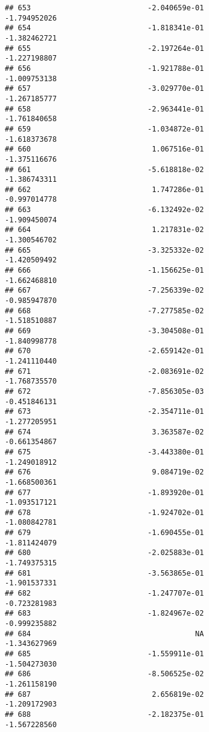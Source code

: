 \documentclass[
]{article}
\begin{document}
\begin{verbatim}
## 653                           -2.040659e-01               -1.794952026
## 654                           -1.818341e-01               -1.382462721
## 655                           -2.197264e-01               -1.227198807
## 656                           -1.921788e-01               -1.009753138
## 657                           -3.029770e-01               -1.267185777
## 658                           -2.963441e-01               -1.761840658
## 659                           -1.034872e-01               -1.618373678
## 660                            1.067516e-01               -1.375116676
## 661                           -5.618818e-02               -1.386743311
## 662                            1.747286e-01               -0.997014778
## 663                           -6.132492e-02               -1.909450074
## 664                            1.217831e-02               -1.300546702
## 665                           -3.325332e-02               -1.420509492
## 666                           -1.156625e-01               -1.662468810
## 667                           -7.256339e-02               -0.985947870
## 668                           -7.277585e-02               -1.518510887
## 669                           -3.304508e-01               -1.840998778
## 670                           -2.659142e-01               -1.241110440
## 671                           -2.083691e-02               -1.768735570
## 672                           -7.856305e-03               -0.451846131
## 673                           -2.354711e-01               -1.277205951
## 674                            3.363587e-02               -0.661354867
## 675                           -3.443380e-01               -1.249018912
## 676                            9.084719e-02               -1.668500361
## 677                           -1.893920e-01               -1.093517121
## 678                           -1.924702e-01               -1.080842781
## 679                           -1.690455e-01               -1.811424079
## 680                           -2.025883e-01               -1.749375315
## 681                           -3.563865e-01               -1.901537331
## 682                           -1.247707e-01               -0.723281983
## 683                           -1.824967e-02               -0.999235882
## 684                                      NA               -1.343627969
## 685                           -1.559911e-01               -1.504273030
## 686                           -8.506525e-02               -1.261158190
## 687                            2.656819e-02               -1.209172903
## 688                           -2.182375e-01               -1.567228560

\end{verbatim}
\end{document}
